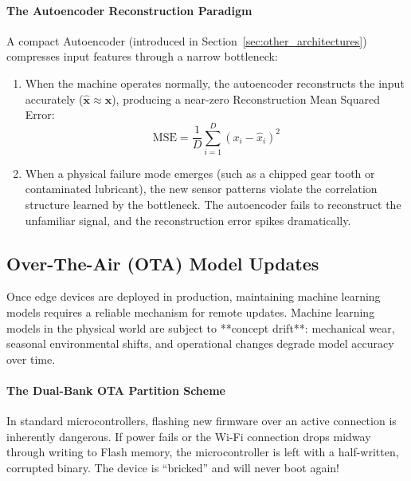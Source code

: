 \paragraph{The Autoencoder Reconstruction Paradigm}
A compact Autoencoder (introduced in Section~\ref{sec:other_architectures}) compresses input features through a narrow bottleneck:
\begin{enumerate}
    \item When the machine operates normally, the autoencoder reconstructs the input accurately ($\hat{\mathbf{x}} \approx \mathbf{x}$), producing a near-zero Reconstruction Mean Squared Error:
    \begin{equation}
    \text{MSE} = \frac{1}{D} \sum_{i=1}^D (x_i - \hat{x}_i)^2\label{eq:reconstruction_mse}
    \end{equation}
    \item When a physical failure mode emerges (such as a chipped gear tooth or contaminated lubricant), the new sensor patterns violate the correlation structure learned by the bottleneck. The autoencoder fails to reconstruct the unfamiliar signal, and the reconstruction error spikes dramatically.
\end{enumerate}

\subsection{Over-The-Air (OTA) Model Updates}\label{subsec:ota_updates}

Once edge devices are deployed in production, maintaining machine learning models requires a reliable mechanism for remote updates. Machine learning models in the physical world are subject to **concept drift**: mechanical wear, seasonal environmental shifts, and operational changes degrade model accuracy over time.

\paragraph{The Dual-Bank OTA Partition Scheme}
In standard microcontrollers, flashing new firmware over an active connection is inherently dangerous. If power fails or the Wi-Fi connection drops midway through writing to Flash memory, the microcontroller is left with a half-written, corrupted binary. The device is ``bricked'' and will never boot again!

